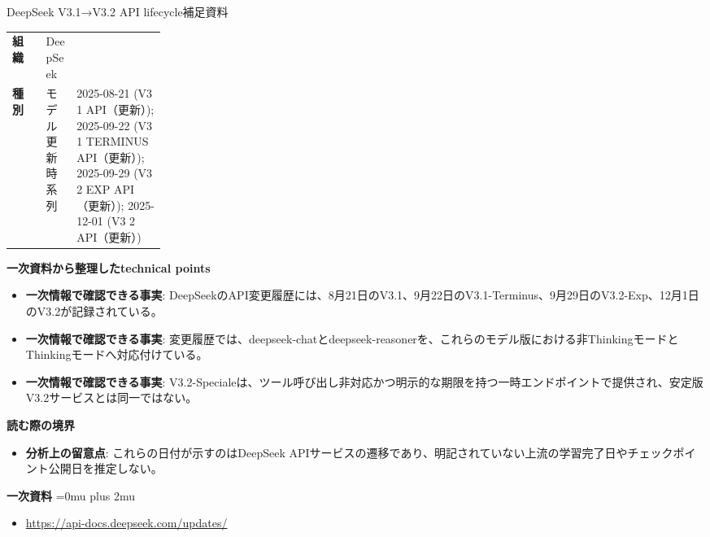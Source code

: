 \begin{technicalnote}{DeepSeek V3.1→V3.2 API lifecycle}{補足資料}
\begingroup
\begin{tabularx}{\linewidth}{@{}>{\bfseries}p{0.22\linewidth}X@{}}
組織 & DeepSeek \\
種別 & モデル更新
時系列 & 2025-08-21 (V3 1 API（更新）); 2025-09-22 (V3 1 TERMINUS API（更新）); 2025-09-29 (V3 2 EXP API（更新）); 2025-12-01 (V3 2 API（更新）) \\
\end{tabularx}
\smallskip
{\bfseries 一次資料から整理したtechnical points}
\begin{itemize}[leftmargin=1.5em,itemsep=0.35em]
\item \textbf{一次情報で確認できる事実}: DeepSeekのAPI変更履歴には、8月21日のV3.1、9月22日のV3.1-Terminus、9月29日のV3.2-Exp、12月1日のV3.2が記録されている。
\item \textbf{一次情報で確認できる事実}: 変更履歴では、deepseek-chatとdeepseek-reasonerを、これらのモデル版における非ThinkingモードとThinkingモードへ対応付けている。
\item \textbf{一次情報で確認できる事実}: V3.2-Specialeは、ツール呼び出し非対応かつ明示的な期限を持つ一時エンドポイントで提供され、安定版V3.2サービスとは同一ではない。
\end{itemize}
\begin{minipage}{\linewidth}
{\bfseries 読む際の境界}
\begin{itemize}[leftmargin=1.5em,itemsep=0.35em]
\item \textbf{分析上の留意点}: これらの日付が示すのはDeepSeek APIサービスの遷移であり、明記されていない上流の学習完了日やチェックポイント公開日を推定しない。
\end{itemize}
\begin{samepage}
{\bfseries 一次資料}
\begingroup\sloppy
\Urlmuskip=0mu plus 2mu\relax
\begin{itemize}[leftmargin=1.5em,itemsep=0.25em]
\item {\scriptsize\url{https://api-docs.deepseek.com/updates/}}
\end{itemize}
\endgroup
\end{samepage}
\end{minipage}
\endgroup
\end{technicalnote}
\medskip

